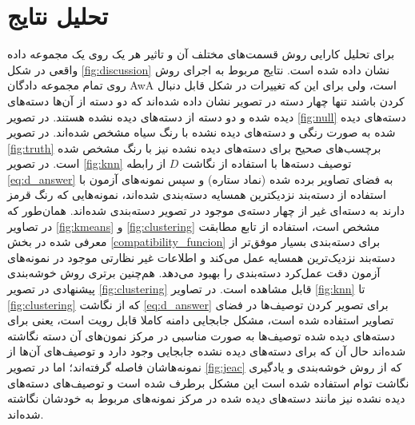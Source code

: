 \section{تحلیل نتایج}\label{exp:discussion}
برای تحلیل کارایی روش قسمت‌های مختلف آن و تاثیر هر یک  روی یک مجموعه داده واقعی در شکل
\ref{fig:discussion}
 نشان داده شده است. نتایج مربوط به اجرای روش روی تمام مجموعه دادگان AwA است، ولی برای این که تغییرات در شکل قابل دنبال کردن باشند تنها چهار دسته در  تصویر نشان داده شده‌اند که دو دسته از آن‌ها دسته‌های دیده شده و دو دسته از دسته‌های دیده نشده هستند. در تصویر
\ref{fig:null}
دسته‌های دیده شده به صورت رنگی و دسته‌های دیده نشده با رنگ سیاه مشخص شده‌اند. در تصویر
\ref{fig:truth}
برچسب‌های صحیح برای دسته‌های دیده نشده نیز با رنگ مشخص شده است. در تصویر
\ref{fig:knn}
توصیف دسته‌ها با استفاده از نگاشت $D$ از رابطه \eqref{eq:d_answer} به فضای تصاویر برده شده (نماد ستاره) و سپس نمونه‌های آزمون با استفاده از دسته‌بند نزدیکترین همسایه دسته‌بندی شده‌اند، نمونه‌هایی که رنگ قرمز دارند به دسته‌ای غیر از چهار دسته‌ی موجود در تصویر دسته‌بندی شده‌اند. همان‌طور که در تصاویر
\ref{fig:kmeans} و \ref{fig:clustering}
مشخص است، استفاده از  تابع مطابقت معرفی شده در بخش \ref{compatibility_funcion} برای دسته‌بندی بسیار موفق‌تر از دسته‌بند نزدیک‌ترین همسایه عمل می‌کند و اطلاعات غیر نظارتی موجود در نمونه‌های آزمون دقت عمل‌کرد دسته‌بندی را بهبود می‌دهد. هم‌چنین برتری روش خوشه‌بندی پیشنهادی در تصویر \ref{fig:clustering} قابل مشاهده است. در تصاویر \ref{fig:knn} تا \ref{fig:clustering} که از نگاشت  \eqref{eq:d_answer} برای تصویر کردن توصیف‌ها در فضای تصاویر استفاده شده است، مشکل جابجایی دامنه کاملا قابل رویت است، یعنی برای دسته‌های دیده شده توصیف‌ها به صورت مناسبی در مرکز نمون‌های آن دسته نگاشته شده‌اند حال آن که برای دسته‌های دیده نشده جابجایی وجود دارد و توصیف‌های آن‌ها از نمونه‌هاشان فاصله گرفته‌اند؛ اما در تصویر
\ref{fig:jeac}
که از روش خوشه‌بندی و یادگیری نگاشت توام استفاده شده است این مشکل برطرف شده است و توصیف‌های دسته‌های دیده نشده نیز مانند دسته‌های دیده شده در مرکز نمونه‌های مربوط به خودشان نگاشته شده‌اند.

